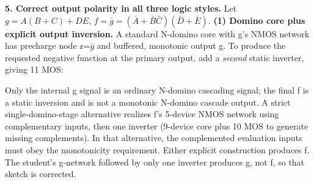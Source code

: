 \documentclass[10pt]{article}
\newcommand{\mos}[4]{\begin{scope}[shift={(#1,#2)}]
\draw (0,.24)--(0,-.24);\draw (0,.20)--(.25,.20)--(.25,.5);
\draw (0,-.20)--(.25,-.20)--(.25,-.5);\draw (-.16,.23)--(-.16,-.23);
\ifnum#4=1\draw (-.26,0) circle (.06);\draw (-.75,0)--(-.32,0);\else\draw (-.75,0)--(-.16,0);\fi
\node[anchor=east,font=\scriptsize] at (-.76,0) {$#3$};\end{scope}}
\begin{document}
\newpage\textbf{5. Correct output polarity in all three logic styles.}
Let $g=A(B+C)+DE$, $f=\bar g=(\bar A+\bar B\bar C)(\bar D+\bar E)$.
\textbf{(1) Domino core plus explicit output inversion.} A standard N-domino core with g's NMOS network has precharge node z=$\bar g$ and buffered, monotonic output g. To produce the requested negative function at the primary output, add a \emph{second} static inverter, giving 11 MOS:
\begin{center}\end{center}
Only the internal g signal is an ordinary N-domino cascading signal; the final f is a static inversion and is not a monotonic N-domino cascade output. A strict single-domino-stage alternative realizes f's 5-device NMOS network using complementary inputs, then one inverter (9-device core plus 10 MOS to generate missing complements). In that alternative, the complemented evaluation inputs must obey the monotonicity requirement. Either explicit construction produces f. The student's g-network followed by only one inverter produces g, not f, so that sketch is corrected.
\end{document}
